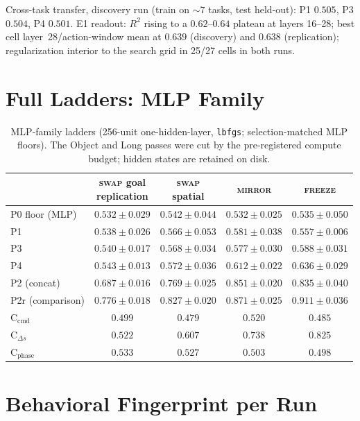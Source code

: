 \documentclass{article}
\begin{document}
Cross-task transfer, discovery run (train on ${\sim}7$ tasks, test held-out):
P1 $0.505$, P3 $0.504$, P4 $0.501$. E1 readout: $R^2$ rising to a
$0.62$--$0.64$ plateau at layers 16--28; best cell layer~28/action-window
mean at $0.639$ (discovery) and $0.638$ (replication); regularization
interior to the search grid in 25/27 cells in both runs.

\section{Full Ladders: MLP Family}
\label{app:mlp}

\begin{table}[h]
\caption{MLP-family ladders (256-unit one-hidden-layer, \texttt{lbfgs};
selection-matched MLP floors). The Object and Long passes were cut by the
pre-registered compute budget; hidden states are retained on disk.}
\label{tab:arms-mlp}
\vskip 0.1in
\centering
\footnotesize
\begin{tabular}{lcccc}
\toprule
& \shortstack{\textsc{swap} goal\\replication} & \shortstack{\textsc{swap}\\spatial} & \textsc{mirror} & \textsc{freeze} \\
\midrule
P0 floor (MLP) & $0.532\pm0.029$ & $0.542\pm0.044$ & $0.532\pm0.025$ & $0.535\pm0.050$ \\
P1 & $0.538\pm0.026$ & $0.566\pm0.053$ & $0.581\pm0.038$ & $0.557\pm0.006$ \\
P3 & $0.540\pm0.017$ & $0.568\pm0.034$ & $0.577\pm0.030$ & $0.588\pm0.031$ \\
P4 & $0.543\pm0.013$ & $0.572\pm0.036$ & $0.612\pm0.022$ & $0.636\pm0.029$ \\
P2 (concat) & $0.687\pm0.016$ & $0.769\pm0.025$ & $0.851\pm0.020$ & $0.835\pm0.040$ \\
P2r (comparison) & $0.776\pm0.018$ & $0.827\pm0.020$ & $0.871\pm0.025$ & $0.911\pm0.036$ \\
C$_{\text{cmd}}$ & $0.499$ & $0.479$ & $0.520$ & $0.485$ \\
C$_{\Delta s}$ & $0.522$ & $0.607$ & $0.738$ & $0.825$ \\
C$_{\text{phase}}$ & $0.533$ & $0.527$ & $0.503$ & $0.498$ \\
\bottomrule
\end{tabular}
\end{table}

\section{Behavioral Fingerprint per Run}
\label{app:e3}
\end{document}

